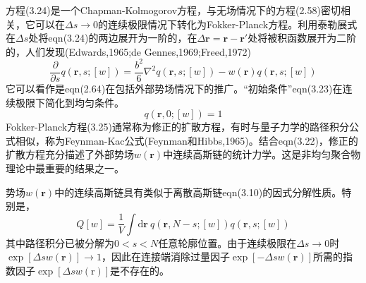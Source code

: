 方程(3.24)是一个Chapman-Kolmogorov方程，与无场情况下的方程(2.58)密切相关，它可以在$\Delta s\rightarrow 0$的连续极限情况下转化为Fokker-Planck方程。利用泰勒展式在$\Delta s$处将eqn(3.24)的两边展开为一阶的，在$\Delta\mathbf{r}=\mathbf{r}-\mathbf{r}'$处将被积函数展开为二阶的，人们发现(Edwards,1965;de Gennes,1969;Freed,1972)
\begin{equation}
\frac{\partial}{\partial s}q(\mathbf{r},s;[w])=\frac{b^2}{6}\nabla^2q(\mathbf{r},s;[w])-w(\mathbf{r})q(\mathbf{r},s;[w])
\end{equation}
它可以看作是eqn(2.64)在包括外部势场情况下的推广。“初始条件”eqn(3.23)在连续极限下简化到均匀条件。
\begin{equation}
q(\mathbf{r},0;[w])=1
\end{equation}
Fokker-Planck方程(3.25)通常称为修正的扩散方程，有时与量子力学的路径积分公式相似，称为Feynman-Kac公式(Feynman和Hibbs,1965)。结合eqn(3.22)，修正的扩散方程充分描述了外部势场$w(\mathbf{r})$中连续高斯链的统计力学。这是非均匀聚合物理论中最重要的结果之一。

势场$w(\mathbf{r})$中的连续高斯链具有类似于离散高斯链eqn(3.10)的因式分解性质。特别是，
\begin{equation}
Q[w]=\frac{1}{V}\int\mathrm{d}\mathbf{r}~q(\mathbf{r},N-s;[w])q(\mathbf{r},s;[w])
\end{equation}
其中路径积分已被分解为$0<s<N$任意轮廓位置。由于连续极限在$\Delta s\rightarrow 0$时$\exp[\Delta sw(\mathbf{r})]\rightarrow 1$，因此在连接端消除过量因子$\exp[-\Delta sw(\mathbf{r})]$所需的指数因子$\exp[\Delta sw(\mathrm{r})]$是不存在的。

